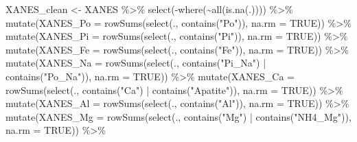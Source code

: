 \documentclass[
]{article}
\newenvironment{Shaded}{\begin{snugshade}}{\end{snugshade}}
\newcommand{\AttributeTok}[1]{\textcolor[rgb]{0.77,0.63,0.00}{#1}}
\newcommand{\ConstantTok}[1]{\textcolor[rgb]{0.00,0.00,0.00}{#1}}
\newcommand{\FunctionTok}[1]{\textcolor[rgb]{0.00,0.00,0.00}{#1}}
\newcommand{\NormalTok}[1]{#1}
\newcommand{\OtherTok}[1]{\textcolor[rgb]{0.56,0.35,0.01}{#1}}
\newcommand{\SpecialCharTok}[1]{\textcolor[rgb]{0.00,0.00,0.00}{#1}}
\newcommand{\StringTok}[1]{\textcolor[rgb]{0.31,0.60,0.02}{#1}}
\begin{document}
\begin{Shaded}
\begin{Highlighting}[]
\NormalTok{XANES\_clean }\OtherTok{\textless{}{-}}\NormalTok{ XANES }\SpecialCharTok{\%\textgreater{}\%}
  \FunctionTok{select}\NormalTok{(}\SpecialCharTok{{-}}\FunctionTok{where}\NormalTok{(}\SpecialCharTok{\textasciitilde{}}\FunctionTok{all}\NormalTok{(}\FunctionTok{is.na}\NormalTok{(.)))) }\SpecialCharTok{\%\textgreater{}\%}
  \FunctionTok{mutate}\NormalTok{(}\AttributeTok{XANES\_Po =} \FunctionTok{rowSums}\NormalTok{(}\FunctionTok{select}\NormalTok{(., }\FunctionTok{contains}\NormalTok{(}\StringTok{"Po"}\NormalTok{)), }\AttributeTok{na.rm =} \ConstantTok{TRUE}\NormalTok{)) }\SpecialCharTok{\%\textgreater{}\%}
  \FunctionTok{mutate}\NormalTok{(}\AttributeTok{XANES\_Pi =} \FunctionTok{rowSums}\NormalTok{(}\FunctionTok{select}\NormalTok{(., }\FunctionTok{contains}\NormalTok{(}\StringTok{"Pi"}\NormalTok{)), }\AttributeTok{na.rm =} \ConstantTok{TRUE}\NormalTok{)) }\SpecialCharTok{\%\textgreater{}\%}
  \FunctionTok{mutate}\NormalTok{(}\AttributeTok{XANES\_Fe =} \FunctionTok{rowSums}\NormalTok{(}\FunctionTok{select}\NormalTok{(., }\FunctionTok{contains}\NormalTok{(}\StringTok{"Fe"}\NormalTok{)), }\AttributeTok{na.rm =} \ConstantTok{TRUE}\NormalTok{)) }\SpecialCharTok{\%\textgreater{}\%}
  \FunctionTok{mutate}\NormalTok{(}\AttributeTok{XANES\_Na =} \FunctionTok{rowSums}\NormalTok{(}\FunctionTok{select}\NormalTok{(., }\FunctionTok{contains}\NormalTok{(}\StringTok{"Pi\_Na"}\NormalTok{) }\SpecialCharTok{|} \FunctionTok{contains}\NormalTok{(}\StringTok{"Po\_Na"}\NormalTok{)), }\AttributeTok{na.rm =} \ConstantTok{TRUE}\NormalTok{)) }\SpecialCharTok{\%\textgreater{}\%}
  \FunctionTok{mutate}\NormalTok{(}\AttributeTok{XANES\_Ca =} \FunctionTok{rowSums}\NormalTok{(}\FunctionTok{select}\NormalTok{(., }\FunctionTok{contains}\NormalTok{(}\StringTok{"Ca"}\NormalTok{) }\SpecialCharTok{|} \FunctionTok{contains}\NormalTok{(}\StringTok{"Apatite"}\NormalTok{)), }\AttributeTok{na.rm =} \ConstantTok{TRUE}\NormalTok{)) }\SpecialCharTok{\%\textgreater{}\%}
  \FunctionTok{mutate}\NormalTok{(}\AttributeTok{XANES\_Al =} \FunctionTok{rowSums}\NormalTok{(}\FunctionTok{select}\NormalTok{(., }\FunctionTok{contains}\NormalTok{(}\StringTok{"Al"}\NormalTok{)), }\AttributeTok{na.rm =} \ConstantTok{TRUE}\NormalTok{)) }\SpecialCharTok{\%\textgreater{}\%}
  \FunctionTok{mutate}\NormalTok{(}\AttributeTok{XANES\_Mg =} \FunctionTok{rowSums}\NormalTok{(}\FunctionTok{select}\NormalTok{(., }\FunctionTok{contains}\NormalTok{(}\StringTok{"Mg"}\NormalTok{) }\SpecialCharTok{|} \FunctionTok{contains}\NormalTok{(}\StringTok{"NH4\_Mg"}\NormalTok{)), }\AttributeTok{na.rm =} \ConstantTok{TRUE}\NormalTok{)) }\SpecialCharTok{\%\textgreater{}\%}

\end{Highlighting}
\end{Shaded}
\end{document}
